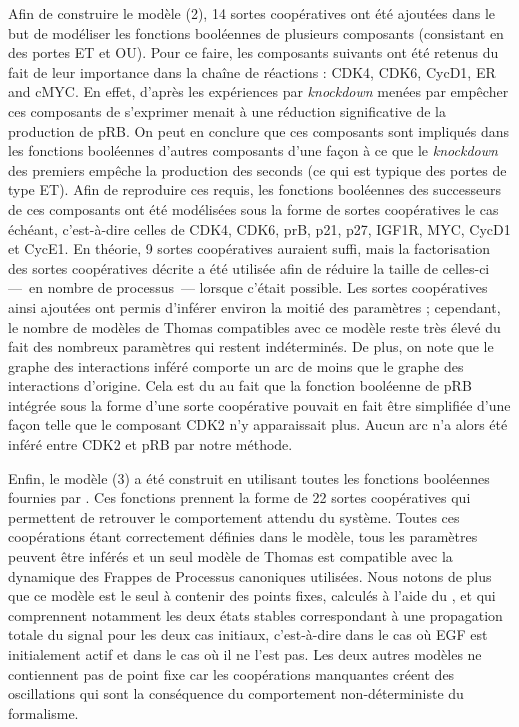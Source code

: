 Afin de construire le modèle (2), 14 sortes coopératives ont été ajoutées dans le but de
modéliser les fonctions booléennes de plusieurs composants (consistant en des portes ET et OU).
Pour ce faire, les composants suivants ont été retenus du fait de leur importance dans la
chaîne de réactions : CDK4, CDK6, CycD1, ER\nbd \textalpha{} and c\nbd MYC.
En effet, d'après les expériences par \textit{knockdown} menées par 
empêcher ces composants de s'exprimer menait à une réduction significative de la production
de pRB.
On peut en conclure que ces composants sont impliqués dans les fonctions booléennes
d'autres composants d'une façon à ce que le \textit{knockdown} des premiers
empêche la production des seconds (ce qui est typique des portes de type ET).
Afin de reproduire ces requis, les fonctions booléennes des successeurs de ces composants
ont été modélisées sous la forme de sortes coopératives le cas échéant, c'est-à-dire celles de
CDK4, CDK6, prB, p21, p27, IGF1R, MYC, CycD1 et CycE1.
En théorie, 9 sortes coopératives auraient suffi, mais la factorisation des sortes coopératives
décrite  a été utilisée afin de réduire la taille de celles-ci
---~en nombre de processus~--- lorsque c'était possible.
Les sortes coopératives ainsi ajoutées ont permis d'inférer environ la moitié des paramètres ;
cependant, le nombre de modèles de Thomas compatibles avec ce modèle reste très élevé
du fait des nombreux paramètres qui restent indéterminés.
De plus, on note que le graphe des interactions inféré comporte un arc de moins que
le graphe des interactions d'origine.
Cela est du au fait que la fonction booléenne de pRB intégrée sous la forme
d'une sorte coopérative pouvait en fait être simplifiée
d'une façon telle que le composant CDK2 n'y apparaissait plus.
Aucun arc n'a alors été inféré entre CDK2 et pRB par notre méthode.

Enfin, le modèle (3) a été construit en utilisant toutes les fonctions booléennes
fournies par .
Ces fonctions prennent la forme de 22 sortes coopératives qui permettent de retrouver
le comportement attendu du système.
Toutes ces coopérations étant correctement définies dans le modèle,
tous les paramètres peuvent être inférés et un seul modèle de Thomas est compatible
avec la dynamique des Frappes de Processus canoniques utilisées.
Nous notons de plus que ce modèle est le seul à contenir des points fixes,
calculés à l'aide du ,
et qui comprennent notamment les deux états stables correspondant à une propagation
totale du signal pour les deux cas initiaux,
c'est-à-dire dans le cas où EGF est initialement actif et dans le cas où il ne l'est pas.
Les deux autres modèles ne contiennent pas de point fixe car les coopérations manquantes
créent des oscillations qui sont la conséquence du comportement non-déterministe
du formalisme.




